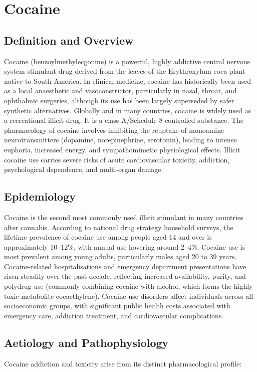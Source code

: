 \chapter{Cocaine}

\section*{Definition and Overview}
Cocaine (benzoylmethylecgonine) is a powerful, highly addictive central nervous system stimulant drug derived from the leaves of the Erythroxylum coca plant native to South America. In clinical medicine, cocaine has historically been used as a local anaesthetic and vasoconstrictor, particularly in nasal, throat, and ophthalmic surgeries, although its use has been largely superseded by safer synthetic alternatives. Globally and in many countries, cocaine is widely used as a recreational illicit drug. It is a class A/Schedule 8 controlled substance. The pharmacology of cocaine involves inhibiting the reuptake of monoamine neurotransmitters (dopamine, norepinephrine, serotonin), leading to intense euphoria, increased energy, and sympathomimetic physiological effects. Illicit cocaine use carries severe risks of acute cardiovascular toxicity, addiction, psychological dependence, and multi-organ damage.

\section*{Epidemiology}
Cocaine is the second most commonly used illicit stimulant in many countries after cannabis. According to national drug strategy household surveys, the lifetime prevalence of cocaine use among people aged 14 and over is approximately 10--12\%, with annual use hovering around 2--4\%. Cocaine use is most prevalent among young adults, particularly males aged 20 to 39 years. Cocaine-related hospitalisations and emergency department presentations have risen steadily over the past decade, reflecting increased availability, purity, and polydrug use (commonly combining cocaine with alcohol, which forms the highly toxic metabolite cocaethylene). Cocaine use disorders affect individuals across all socioeconomic groups, with significant public health costs associated with emergency care, addiction treatment, and cardiovascular complications.

\section*{Aetiology and Pathophysiology}
Cocaine addiction and toxicity arise from its distinct pharmacological profile:

